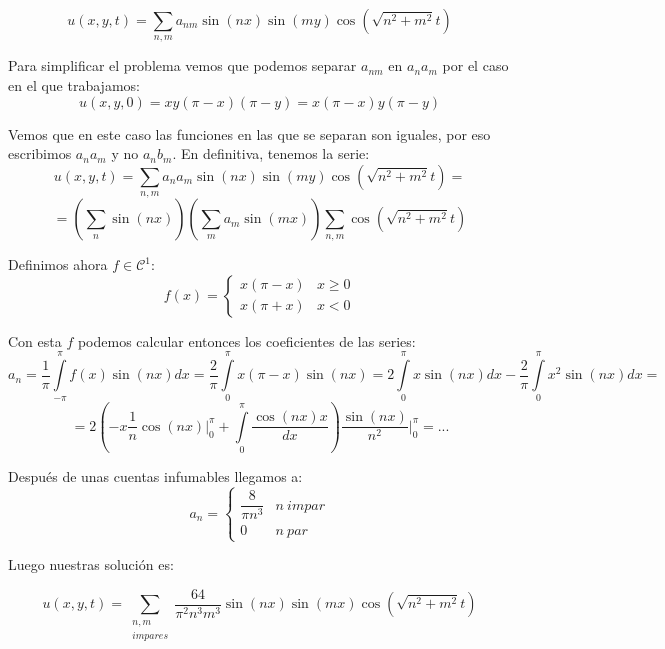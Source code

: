 \documentclass[openany]{book}
\begin{document}
\begin{example}
  $$ u(x,y,t) = \sum\limits_{n,m}^{}a_{nm}\sin(nx)\sin(my) \cos(\sqrt{n^2+m^2}t) $$

  Para simplificar el problema vemos que podemos separar $ a_{nm} $ en $ a_na_m $ por el caso en el que trabajamos:
  $$ u(x,y,0) = xy(\pi-x)(\pi-y) = x(\pi-x)y(\pi-y) $$

  Vemos que en este caso las funciones en las que se separan son iguales, por eso escribimos $ a_na_m $ y no $ a_nb_m $. En definitiva, tenemos la serie:
  $$ u(x,y,t) =  \sum\limits_{n,m}^{} a_na_m \sin(nx) \sin(my) \cos(\sqrt{n^2+m^2}t) = $$ 
  $$ =\left( \sum\limits_{n}^{}\sin(nx) \right) \left( \sum\limits_{m}^{}a_m \sin(mx) \right) \sum\limits_{n,m}^{} \cos(\sqrt{n^2+m^2}t) $$

  Definimos ahora $ f \in \mathcal{C}^1$:
  $$ f(x) = \left\{
  \begin{array}{ll}
    x(\pi-x) & x\geq 0 \\ 
    x(\pi+x) & x<0
  \end{array}
  \right. $$
  
  Con esta $ f $ podemos calcular entonces los coeficientes de las series:
  $$ a_n = \dfrac{1}{\pi} \int\limits_{-\pi}^{\pi}f(x) \sin(nx)dx = \dfrac{2}{\pi} \int\limits_{0}^{\pi}x (\pi-x)\sin(nx) = 2 \int\limits_{0}^{\pi}x \sin(nx)dx -\dfrac{2}{\pi} \int\limits_{0}^{\pi}x^2 \sin(nx)dx = $$
  $$  = 2 \left( -x \dfrac{1}{n}\cos(nx) \Biggr|_{0}^{\pi} + \int\limits_{0}^{\pi} \dfrac{\cos(nx)x}{dx} \right) \dfrac{\sin(nx)}{n^2} \Biggr|_{0}^{\pi}  = ...$$

  Después de unas cuentas infumables llegamos a:
  $$ a_n = \left\{
  \begin{array}{ll}
    \dfrac{8}{\pi n^3} & n\ impar\\ 
    0 & n\ par
  \end{array}
  \right. $$
  
  Luego nuestras solución es:

  $$ u(x,y,t) = \sum\limits _{\substack{n,m\\ impares}}^{} \dfrac{64}{\pi^2n ^3m^3} \sin(nx)\sin(mx)\cos(\sqrt{n^2+m^2}t) $$

\end{example}
\end{document}
